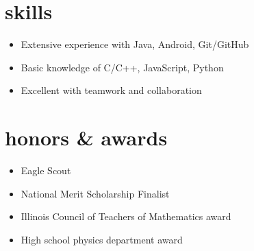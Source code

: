 \documentclass[print,nofooter]{resume}
\begin{document}

\section{skills}

\noindent\begin{itemize}[leftmargin=0.45cm]
\setlength{\itemsep}{-5pt}
\item Extensive experience with Java, Android, Git/GitHub
\item Basic knowledge of C/C++, JavaScript, Python
\item Excellent with teamwork and collaboration
\end{itemize}\vspace{\parskip}



\section{honors \& awards}

\noindent\begin{itemize}[leftmargin=0.45cm]
\setlength{\itemsep}{-5pt}
\item Eagle Scout
\item National Merit Scholarship Finalist
\item Illinois Council of Teachers of Mathematics award
\item High school physics department award
\end{itemize}
\end{document}

